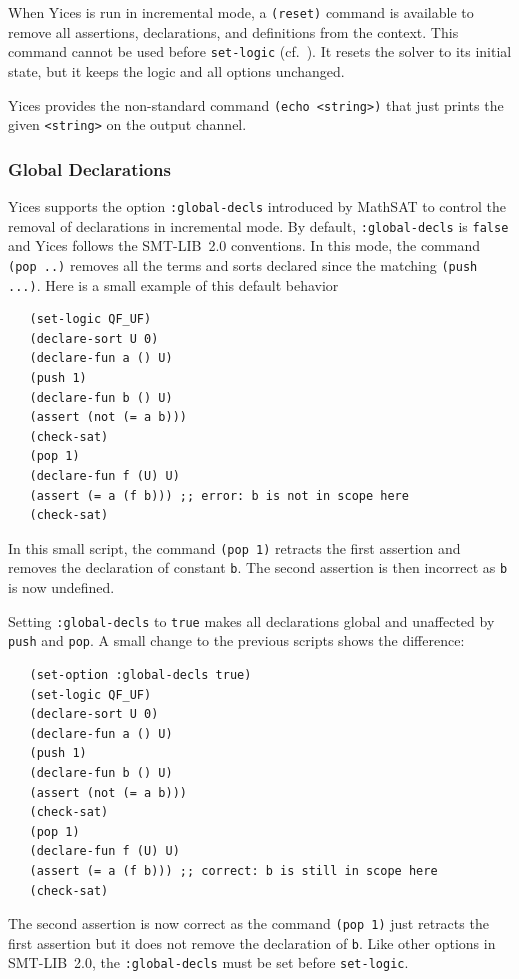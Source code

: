 \documentclass[11pt,twoside,fleqn,openright,titlepage]{cslreport}
\begin{document}
\medskip\noindent When Yices is run in incremental mode, a
\texttt{(reset)} command is available to remove all assertions,
declarations, and definitions from the context. This command cannot be
used before \texttt{set-logic} (cf.~\cite{SMTLIB20:2012}). It resets
the solver to its initial state, but it keeps the logic and all
options unchanged.

\medskip\noindent Yices provides the non-standard command
\texttt{(echo <string>)} that just prints the given \texttt{<string>}
on the output channel.

\subsubsection*{Global Declarations}

Yices supports the option \texttt{:global-decls} introduced by MathSAT
to control the removal of declarations in incremental mode. By
default, \texttt{:global-decls} is \texttt{false} and Yices follows
the SMT-LIB~2.0 conventions. In this mode, the command \texttt{(pop
  ..)}  removes all the terms and sorts declared since the matching
\texttt{(push ...)}. Here is a small example of this default behavior
\begin{small}
\begin{verbatim}
   (set-logic QF_UF)
   (declare-sort U 0)
   (declare-fun a () U)
   (push 1)
   (declare-fun b () U)
   (assert (not (= a b)))
   (check-sat)
   (pop 1)
   (declare-fun f (U) U)
   (assert (= a (f b))) ;; error: b is not in scope here
   (check-sat)
\end{verbatim}
\end{small}
In this small script, the command \texttt{(pop 1)} retracts the first
assertion and removes the declaration of constant \texttt{b}.  The
second assertion is then incorrect as \texttt{b} is now undefined.

\medskip\noindent Setting \texttt{:global-decls} to \texttt{true}
makes all declarations global and unaffected by \texttt{push} and
\texttt{pop}. A small change to the previous scripts shows the difference:
\begin{small}
\begin{verbatim}
   (set-option :global-decls true)
   (set-logic QF_UF)
   (declare-sort U 0)
   (declare-fun a () U)
   (push 1)
   (declare-fun b () U)
   (assert (not (= a b)))
   (check-sat)
   (pop 1)
   (declare-fun f (U) U)
   (assert (= a (f b))) ;; correct: b is still in scope here
   (check-sat)
\end{verbatim}
\end{small}
The second assertion is now correct as the command \texttt{(pop 1)}
just retracts the first assertion but it does not remove the
declaration of \texttt{b}.  Like other options in SMT-LIB~2.0, the
\texttt{:global-decls} must be set before \texttt{set-logic}.
\end{document}
